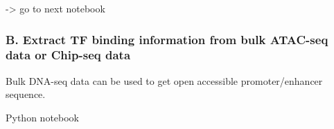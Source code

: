 \documentclass[letterpaper,10pt,english]{sphinxmanual}
\begin{document}
{
%
\begin{sphinxVerbatim}[commandchars=\\\{\}]
\llap{\color{nbsphinxin}[11]:\,\hspace{\fboxrule}\hspace{\fboxsep}}
\end{sphinxVerbatim}
}

-\textgreater{} go to next notebook


\subsubsection{B. Extract TF binding information from bulk ATAC-seq data or Chip-seq data}
\label{\detokenize{tutorials/atac:b-extract-tf-binding-information-from-bulk-atac-seq-data-or-chip-seq-data}}
Bulk DNA-seq data can be used to get open accessible promoter/enhancer sequence.

Python notebook
\end{document}

